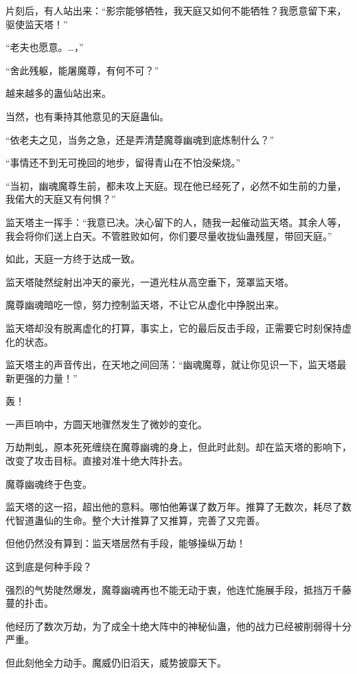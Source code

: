 
\begin{this_body}

片刻后，有人站出来：“影宗能够牺牲，我天庭又如何不能牺牲？我愿意留下来，驱使监天塔！”

“老夫也愿意。…，”

“舍此残躯，能屠魔尊，有何不可？”

越来越多的蛊仙站出来。

当然，也有秉持其他意见的天庭蛊仙。

“依老夫之见，当务之急，还是弄清楚魔尊幽魂到底炼制什么？”

“事情还不到无可挽回的地步，留得青山在不怕没柴烧。”

“当初，幽魂魔尊生前，都未攻上天庭。现在他已经死了，必然不如生前的力量，我偌大的天庭又有何惧？”

监天塔主一挥手：“我意已决。决心留下的人，随我一起催动监天塔。其余人等，我会将你们送上白天。不管胜败如何，你们要尽量收拢仙蛊残屋，带回天庭。”

如此，天庭一方终于达成一致。

监天塔陡然绽射出冲天的豪光，一道光柱从高空垂下，笼罩监天塔。

魔尊幽魂暗吃一惊，努力控制监天塔，不让它从虚化中挣脱出来。

监天塔却没有脱离虚化的打算，事实上，它的最后反击手段，正需要它时刻保持虚化的状态。

监天塔主的声音传出，在天地之间回荡：“幽魂魔尊，就让你见识一下，监天塔最新更强的力量！”

轰！

一声巨响中，方圆天地骤然发生了微妙的变化。

万劫荆虬，原本死死缠绕在魔尊幽魂的身上，但此时此刻。却在监天塔的影响下，改变了攻击目标。直接对准十绝大阵扑去。

魔尊幽魂终于色变。

监天塔的这一招，超出他的意料。哪怕他筹谋了数万年。推算了无数次，耗尽了数代智道蛊仙的生命。整个大计推算了又推算，完善了又完善。

但他仍然没有算到：监天塔居然有手段，能够操纵万劫！

这到底是何种手段？

强烈的气势陡然爆发，魔尊幽魂再也不能无动于衷，他连忙施展手段，抵挡万千藤蔓的扑击。

他经历了数次万劫，为了成全十绝大阵中的神秘仙蛊，他的战力已经被削弱得十分严重。

但此刻他全力动手。魔威仍旧滔天，威势披靡天下。


\end{this_body}
